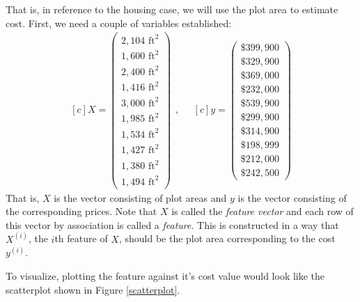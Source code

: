 \documentclass{book}[a5paper]
\begin{document}
\iffalse

That is, in reference to the housing case, we will use the plot
area to estimate cost. First, we need a couple of variables established:
\begin{equation}
    \begin{aligned}[c]
        X =
        \begin{pmatrix}
            2,104 \text{ ft}^2 \\
            1,600 \text{ ft}^2 \\
            2,400 \text{ ft}^2 \\
            1,416 \text{ ft}^2 \\
            3,000 \text{ ft}^2 \\
            1,985 \text{ ft}^2 \\
            1,534 \text{ ft}^2 \\
            1,427 \text{ ft}^2 \\
            1,380 \text{ ft}^2 \\
            1,494 \text{ ft}^2
        \end{pmatrix}
    \end{aligned},
    \quad
    \begin{aligned}[c]
        y =
        \begin{pmatrix}
            \$399,900 \\
            \$329,900 \\
            \$369,000 \\
            \$232,000 \\
            \$539,900 \\
            \$299,900 \\
            \$314,900 \\
            \$198,999 \\
            \$212,000 \\
            \$242,500
        \end{pmatrix}
    \end{aligned}
\end{equation}
That is, $X$ is the vector consisting of plot areas and $y$ is the vector
consisting of the corresponding prices.  Note that $X$ is called the
\emph{feature vector} and each row of this vector by association is called a
\emph{feature}.  This is constructed in a way that $X^{(i)}$, the $i$th feature
of $X$, should be the plot area corresponding to the cost $y^{(i)}$.

To visualize, plotting the feature against it's cost value would look like the
scatterplot shown in Figure \ref{scatterplot}.
\end{document}
